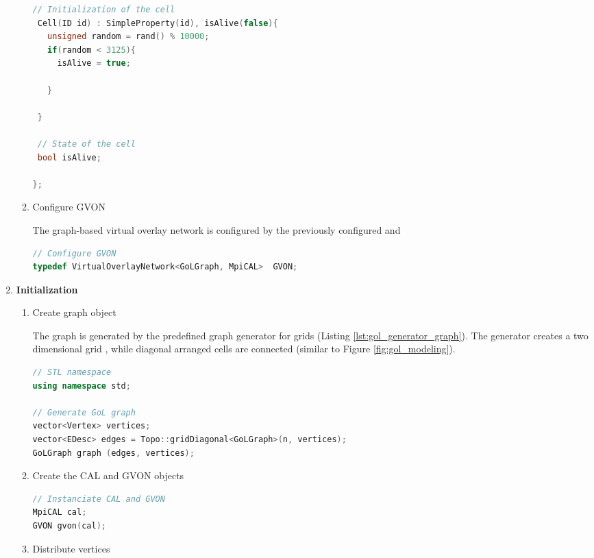 \begin{enumerate}
\begin{enumerate}
\begin{lstlisting}[language=C++, label=lst:gol_cell, caption={}]
 // Initialization of the cell
 Cell(ID id) : SimpleProperty(id), isAlive(false){ 
   unsigned random = rand() % 10000;
   if(random < 3125){ 
     isAlive = true;
     
   }
   
 }

 // State of the cell
 bool isAlive;
 
};
\end{lstlisting}

\item Configure GVON

  The graph-based virtual overlay network is configured by the previously configured
   and 

  \begin{lstlisting}[language=C++, label=lst:conf_gvon, caption={\ }]
// Configure GVON
typedef VirtualOverlayNetwork<GoLGraph, MpiCAL>  GVON;
  \end{lstlisting}

\end{enumerate}

\item \textbf{Initialization}
  \begin{enumerate}
  
  \item Create graph object

    The graph is generated by the predefined graph generator for grids
    (Listing \ref{lst:gol_generator_graph}). The generator creates a
    two dimensional grid , while diagonal arranged cells are connected
    (similar to Figure \ref{fig:gol_modeling}).

  \begin{lstlisting}[language=C++, label=lst:gol_generator_graph, caption={\ }]
// STL namespace
using namespace std;

// Generate GoL graph
vector<Vertex> vertices;
vector<EDesc> edges = Topo::gridDiagonal<GoLGraph>(n, vertices);
GoLGraph graph (edges, vertices); 
  \end{lstlisting}

\item Create the CAL and GVON objects

  \begin{lstlisting}[language=C++, label=lst:, caption={\ }]
// Instanciate CAL and GVON
MpiCAL cal;
GVON gvon(cal);
  \end{lstlisting}

\item Distribute vertices


\end{enumerate}
\end{enumerate}
